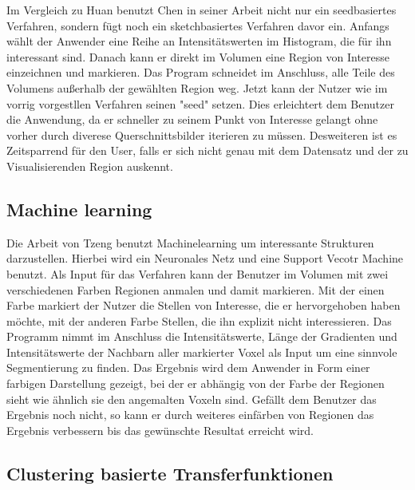 Im Vergleich zu Huan \cite{huang2003rgvis} benutzt Chen  in seiner Arbeit \cite{chen2006sketch} nicht nur ein seedbasiertes Verfahren, sondern fügt noch ein sketchbasiertes Verfahren davor ein.
\newline
Anfangs wählt der Anwender eine Reihe an Intensitätswerten im Histogram, die für ihn interessant sind. Danach kann er direkt im Volumen eine Region von Interesse einzeichnen und markieren. Das Program schneidet im Anschluss, alle Teile des Volumens außerhalb der gewählten Region weg. Jetzt kann der Nutzer wie im vorrig vorgestllen Verfahren seinen "seed" setzen.
\newline
Dies erleichtert dem Benutzer die Anwendung, da er schneller zu seinem Punkt von Interesse gelangt ohne vorher durch diverese Querschnittsbilder iterieren zu müssen. Desweiteren ist es Zeitsparrend für den User, falls er sich nicht genau mit dem Datensatz und der zu Visualisierenden Region auskennt.


\subsection{Machine learning}

Die Arbeit von Tzeng \cite{tzeng2005intelligent} benutzt Machinelearning um interessante Strukturen darzustellen. Hierbei wird ein Neuronales Netz und eine Support Vecotr Machine benutzt.
\newline
Als Input für das Verfahren kann der Benutzer im Volumen mit zwei verschiedenen Farben Regionen anmalen und damit markieren. Mit der einen Farbe markiert der Nutzer die Stellen von Interesse, die er hervorgehoben haben möchte, mit der anderen Farbe Stellen, die ihn explizit nicht interessieren. Das Programm nimmt im Anschluss die Intensitätswerte, Länge der Gradienten und Intensitätswerte der Nachbarn aller markierter Voxel als Input um eine sinnvole Segmentierung zu finden. Das Ergebnis wird dem Anwender in Form einer farbigen Darstellung gezeigt, bei der er abhängig von der Farbe der Regionen sieht wie ähnlich sie den angemalten Voxeln sind. Gefällt dem Benutzer das Ergebnis noch nicht, so kann er durch weiteres einfärben von Regionen das Ergebnis verbessern bis das gewünschte Resultat erreicht wird.



\subsection{Clustering basierte Transferfunktionen}

